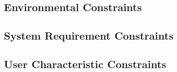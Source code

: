 		\subsection{Environmental Constraints}
		\subsection{System Requirement Constraints}
		\subsection{User Characteristic Constraints}